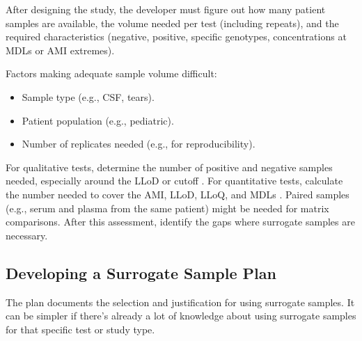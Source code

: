 \documentclass{article}
\begin{document}
After designing the study, the developer must figure out how many patient samples are available, the volume needed per test (including repeats), and the required characteristics (negative, positive, specific genotypes, concentrations at MDLs or AMI extremes).

Factors making adequate sample volume difficult:
\begin{itemize}
    \item Sample type (e.g., CSF, tears).
    \item Patient population (e.g., pediatric).
    \item Number of replicates needed (e.g., for reproducibility).
\end{itemize}

For qualitative tests, determine the number of positive and negative samples needed, especially around the LLoD or cutoff \cite{CLSIEP12, CLSIMM03}. For quantitative tests, calculate the number needed to cover the AMI, LLoD, LLoQ, and MDLs \cite{CLSIEP06, CLSIEP17, CLSIEP09, CLSIMM06}. Paired samples (e.g., serum and plasma from the same patient) might be needed for matrix comparisons. After this assessment, identify the gaps where surrogate samples are necessary.

\subsection{Developing a Surrogate Sample Plan}

The plan documents the selection and justification for using surrogate samples. It can be simpler if there's already a lot of knowledge about using surrogate samples for that specific test or study type.
\end{document}
